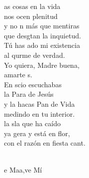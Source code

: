 \begin{cancion}%
	as cosas en la vida\\
	nos ocen plenitud\\
	y no n más que mentiras\\
	que desgtan la inquietud.\\
	Tú has ado mi existencia\\
	al qurme de verdad.\\
	Yo quiera, Madre buena,\\
	amarte s.	\\
\jump
	En scio escuchabas\\
	la Para de Jesús\\
	y la hacas Pan de Vida\\
	medindo en tu interior.\\
	la sla que ha caído\\
	ya gera y está en flor,\\
	con el razón en fiesta cant. \\\jump\\
	\begin{chorus}%
	e Maa,ve Mí\\
	\end{chorus}%
	\jump\\
\end{cancion}%
